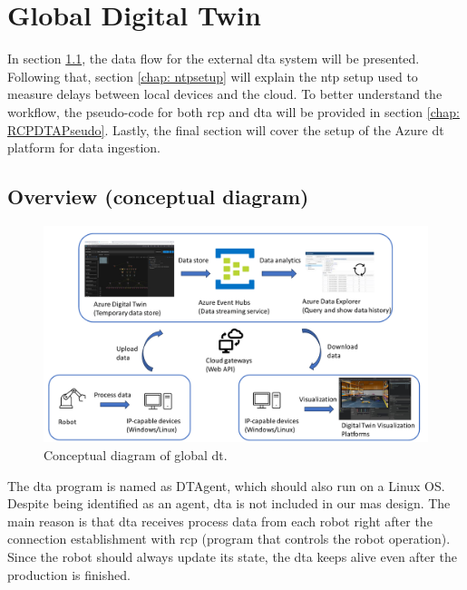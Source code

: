 \section{Global Digital Twin} \label{chap: Meth-External}
In section \ref{chap: Overview-External}, the data flow for the external 
\gls{dta} system will be presented. Following that, section \ref{chap: ntpsetup} 
will explain the \gls{ntp} setup used to measure delays between local devices and 
the cloud. To better understand the workflow, the pseudo-code for both \gls{rcp} 
and \gls{dta} will be provided in section \ref{chap: RCPDTAPseudo}. Lastly, the 
final section will cover the setup of the Azure \gls{dt} platform for data ingestion.



\subsection{Overview (conceptual diagram)}\label{chap: Overview-External}

\begin{figure}[htb]
\includegraphics[width=\textwidth]{figures/DT_Conceptual_Diagram.pdf}

\centering
\caption{Conceptual diagram of global \gls{dt}. \label{fig: DTConceptual}}
\end{figure}

The \gls{dta} program is named as DTAgent, which 
should also run on a Linux OS.
Despite being identified as an agent, \gls{dta} is not included in our 
\gls{mas} design. The main reason is that \gls{dta} receives process data from 
each robot right after the connection establishment with \gls{rcp} 
(program that controls the robot operation). Since the robot 
should always update its state, the \gls{dta} keeps alive even 
after the production is finished. 


